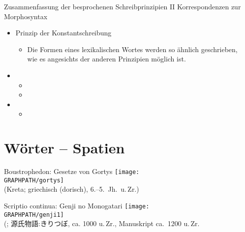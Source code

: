 \begin{frame}
  {Zusammenfassung der besprochenen Schreibprinzipien II}
  Korrespondenzen zur Morphosyntax\\
  \Zeile
  \pause
  \begin{itemize}[<+->]
    \item \alert{Prinzip der Konstantschreibung}
      \begin{itemize}[<+->]
        \item Die Formen eines lexikalischen Wortes werden so ähnlich geschrieben,\\
          wie es angesichts der anderen Prinzipien möglich ist.
      \end{itemize}
      \Zeile
    \item {}
      \begin{itemize}[<+->]
        \item {}
        \item {}
      \end{itemize}
      \Zeile
    \item {}
      \begin{itemize}[<+->]
        \item {}
      \end{itemize}
  \end{itemize}
\end{frame}



\section{Wörter -- Spatien}

\begin{frame}
  {Boustrophedon: Gesetze von Gortys}
  \pause
  \centering
  \texttt{[image: \\GRAPHPATH/gortys]}\\
  {\tiny (Kreta; griechisch (dorisch), 6.--5.\ Jh.\ u.\,Zr.)}
\end{frame}

\begin{frame}
  {Scriptio continua: Genji no Monogatari}
  \pause
  \centering
  \texttt{[image: \\GRAPHPATH/genji1]}\\
  {\tiny (\citealt{Rickmeyer1991}; 源氏物語:きりつぼ, ca. 1000 u.\,Zr., Manuskript ca.\ 1200 u.\,Zr.}
\end{frame}

